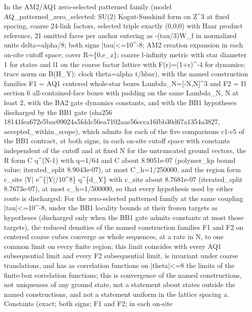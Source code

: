 \begin{gatequote}
In the AM2/AQ1 zero-selected patterned family (model
AQ\_patterned\_zero\_selected: SU(2) Kogut-Susskind form on
Z\textasciicircum{}3 at fixed spacing, coarse 24-link factors, selected triple
exactly (0,0,0) with Haar product reference, 21 omitted faces per anchor
entering as -(tau/3)W\_f in normalized units delta=alpha/8; both signs
|tau|<=10\textasciicircum{}-8; AM2 creation expansion in each on-site cutoff
space; cover R=\{0,e\_z\}; coarse l-infinity metric with star diameter 1 for
states and l1 on the coarse factor lattice with F(r)=(1+r)\textasciicircum{}-4
for dynamics; trace norm on B(H\_Y); clock theta=alpha t/hbar), with the named
construction families F1 = AQ1 centered whole-star boxes
Lambda\_N=[-N,N]\textasciicircum{}3 and F2 = I1 section 6 all-contained-face
boxes with padding on the same Lambda\_N, N at least 2, with the BA2 gate
dynamics constants, and with the BB1 hypotheses discharged by the BB1 gate
(sha256 18141fea672e5bae09024a5fddc56ea7102aae56ecca16fbb30d67a1354a3827,
accepted\_within\_scope), which admits for each of the five comparisons c1-c5
of the BB1 contract, at both signs, in each on-site cutoff space with
constants independent of the cutoff and at fixed N for the untruncated ground
vectors, the R form C q\textasciicircum{}(N-1) with q=1/64 and C about
8.9051e-07 (polymer\_kp bound value; iterated\_split 8.9043e-07), at most
C\_h=1/250000, and the region form c\_site |Y|
e\textasciicircum{}\{|Y|/10\textasciicircum{}8\} q\textasciicircum{}\{d\_Y\}
with c\_site about 8.7681e-07 (iterated\_split 8.7673e-07), at most
c\_h=1/500000, so that every hypothesis used by either route is discharged:
For the zero-selected patterned family at the same coupling
|tau|<=10\textasciicircum{}-8, under the BB1 locality bounds at their frozen
targets as hypotheses (discharged only when the BB1 gate admits constants at
most those targets), the reduced densities of the named construction families
F1 and F2 on centered coarse cubes converge as whole sequences, at a rate in
N, to one common limit on every finite region; this limit coincides with every
AQ1 subsequential limit and every F2 subsequential limit, is invariant under
coarse translations, and has as correlation functions on |theta|<=8 the limits
of the finite-box correlation functions; this is convergence of the named
constructions, not uniqueness of any ground state, not a statement about
states outside the named constructions, and not a statement uniform in the
lattice spacing a. Constants (exact; both signs; F1 and F2; in each on-site

\end{gatequote}
